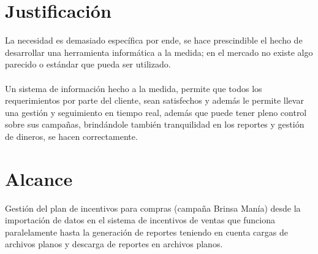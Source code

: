 \section{Justificaci\'on}
La necesidad es demasiado espec\'ifica por ende, se hace prescindible el hecho de desarrollar una herramienta inform\'atica a la medida; en el mercado no existe algo parecido o est\'andar que pueda ser utilizado.%
\\%
\\%
Un sistema de informaci\'on hecho a la medida, permite que todos los requerimientos por parte del cliente, sean satisfechos y adem\'as le permite llevar una gesti\'on y seguimiento en tiempo real, adem\'as que puede tener pleno control sobre sus campa\~nas, brind\'andole tambi\'en tranquilidad en los reportes y gesti\'on de dineros, se hacen correctamente.%
%
\section{Alcance}
Gesti\'on del plan de incentivos para compras (campa\~na Brinsa Man\'ia) desde la importaci\'on de datos en el sistema de incentivos de ventas que funciona paralelamente hasta la generaci\'on de reportes teniendo en cuenta cargas de archivos planos y descarga de reportes en archivos planos.%